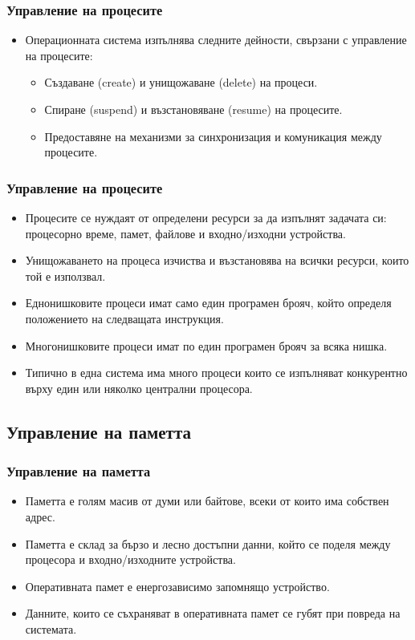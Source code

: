 \documentclass[ignorenonframetext, hyperref=unicode]{beamer}
\begin{document}
    
\begin{frame}
\frametitle{Управление на процесите}
\begin{itemize}
\item Операционната система изпълнява следните дейности, свързани с управление
на процесите:
\begin{itemize}
  \item Създаване (create) и унищожаване (delete) на процеси.
  \item Спиране (suspend) и възстановяване (resume) на процесите.
  \item Предоставяне на механизми за синхронизация и комуникация между
  процесите.
\end{itemize}
\end{itemize}
\end{frame}

\begin{frame}
\frametitle{Управление на процесите}
\begin{itemize}
\item Процесите се нуждаят от определени ресурси за да изпълнят задачата си:
процесорно време, памет, файлове и входно/изходни устройства.
\item Унищожаването на процеса изчиства и възстановява на всички ресурси, които
той е използвал.
\item Еднонишковите процеси имат само един програмен брояч, който определя
положението на следващата инструкция.
\item Многонишковите процеси имат по един програмен брояч за всяка нишка. 
\item Типично в една система има много процеси които се изпълняват конкурентно
върху един или няколко централни процесора.
\end{itemize}
\end{frame}

\subsection{Управление на паметта}

\begin{frame}
\frametitle{Управление на паметта}
\begin{itemize}
\item Паметта е голям масив от думи или байтове, всеки от които има собствен
адрес.
\item Паметта е склад за бързо и лесно достъпни данни, който се поделя между
процесора и входно/изходните устройства.
\item Оперативната памет е енергозависимо запомнящо устройство. 
\item Данните, които
се съхраняват в оперативната памет се губят при повреда на системата.
\end{itemize}
\end{frame}
\end{document}
